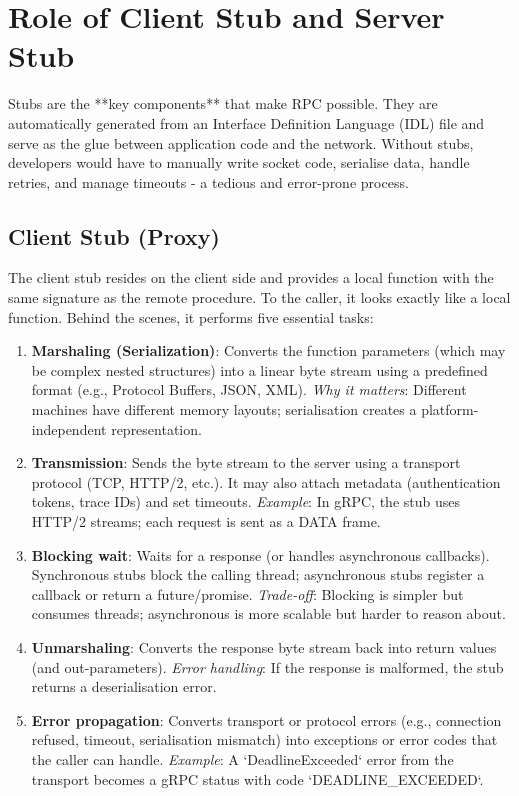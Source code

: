 \documentclass[a4paper]{article}
\begin{document}
\section{Role of Client Stub and Server Stub}
Stubs are the **key components** that make RPC possible. They are automatically generated from an Interface Definition Language (IDL) file and serve as the glue between application code and the network. Without stubs, developers would have to manually write socket code, serialise data, handle retries, and manage timeouts - a tedious and error-prone process.

\subsection{Client Stub (Proxy)}
The client stub resides on the client side and provides a local function with the same signature as the remote procedure. To the caller, it looks exactly like a local function. Behind the scenes, it performs five essential tasks:

\begin{enumerate}
    \item \textbf{Marshaling (Serialization)}: Converts the function parameters (which may be complex nested structures) into a linear byte stream using a predefined format (e.g., Protocol Buffers, JSON, XML).  
        \textit{Why it matters}: Different machines have different memory layouts; serialisation creates a platform-independent representation.

    \item \textbf{Transmission}: Sends the byte stream to the server using a transport protocol (TCP, HTTP/2, etc.). It may also attach metadata (authentication tokens, trace IDs) and set timeouts.  
        \textit{Example}: In gRPC, the stub uses HTTP/2 streams; each request is sent as a DATA frame.

    \item \textbf{Blocking wait}: Waits for a response (or handles asynchronous callbacks). Synchronous stubs block the calling thread; asynchronous stubs register a callback or return a future/promise.  
        \textit{Trade-off}: Blocking is simpler but consumes threads; asynchronous is more scalable but harder to reason about.

    \item \textbf{Unmarshaling}: Converts the response byte stream back into return values (and out-parameters).  
        \textit{Error handling}: If the response is malformed, the stub returns a deserialisation error.

    \item \textbf{Error propagation}: Converts transport or protocol errors (e.g., connection refused, timeout, serialisation mismatch) into exceptions or error codes that the caller can handle.  
        \textit{Example}: A `DeadlineExceeded` error from the transport becomes a gRPC status with code `DEADLINE\_EXCEEDED`.
\end{enumerate}
\end{document}
